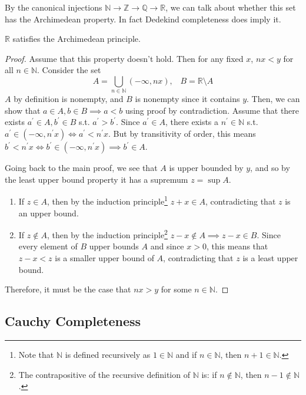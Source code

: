   By the canonical injections $\mathbb{N} \rightarrow \mathbb{Z} \rightarrow \mathbb{Q} \rightarrow \mathbb{R}$, we can talk about whether this set has the Archimedean property. In fact Dedekind completeness does imply it. 

  \begin{theorem}
    $\mathbb{R}$ satisfies the Archimedean principle. 
  \end{theorem}
  \begin{proof}
    Assume that this property doesn't hold. Then for any fixed $x$, $nx < y$ for all $n \in \mathbb{N}$. Consider the set 
    \begin{equation}
      A = \bigcup_{n \in \mathbb{N}} (-\infty, nx), \;\;\; B = \mathbb{R} \setminus A
    \end{equation}
    $A$ by definition is nonempty, and $B$ is nonempty since it contains $y$. Then, we can show that $a \in A, b \in B \implies a < b$ using proof by contradiction. Assume that there exists $a^\prime \in A, b^\prime \in B$ s.t. $a^\prime > b^\prime$. Since $a^\prime \in A$, there exists a $n^\prime \in \mathbb{N}$ s.t. $a^\prime \in (-\infty, n^\prime x) \iff a^\prime < n^\prime x$. But by transitivity of order, this means $b^\prime < n^\prime x \iff b^\prime \in (-\infty, n^\prime x) \implies b^\prime \in A$. 

    Going back to the main proof, we see that $A$ is upper bounded by $y$, and so by the least upper bound property it has a supremum $z = \sup{A}$. 
    \begin{enumerate}
      \item If $z \in A$, then by the induction principle\footnote{Note that $\mathbb{N}$ is defined recursively as $1 \in \mathbb{N}$ and if $n \in \mathbb{N}$, then $n+1 \in \mathbb{N}$. } $z + x \in A$, contradicting that $z$ is an upper bound. 
      \item If $z \not\in A$, then by the induction principle\footnote{The contrapositive of the recursive definition of $\mathbb{N}$ is: if $n \not\in \mathbb{N}$, then $n-1 \not\in \mathbb{N}$.} $z-x \not\in A \implies z-x \in B$. Since every element of $B$ upper bounds $A$ and since $x > 0$, this means that $z-x < z$ is a smaller upper bound of $A$, contradicting that $z$ is a least upper bound. 
    \end{enumerate}
    Therefore, it must be the case that $nx > y$ for some $n \in \mathbb{N}$. 
  \end{proof}

\subsection{Cauchy Completeness} 

